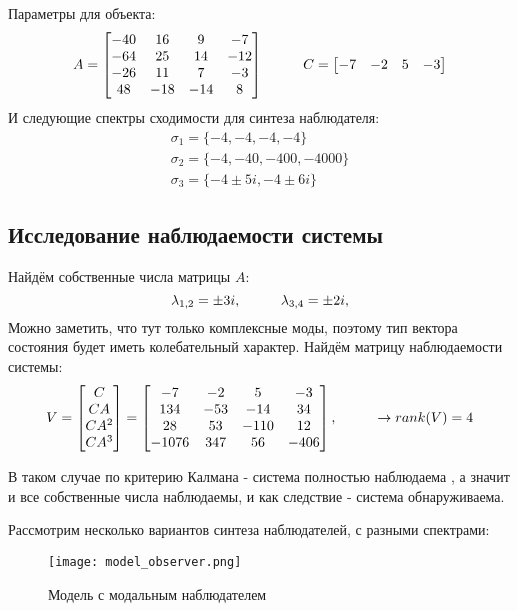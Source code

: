 Параметры для объекта:
$$
  A = \begin{bmatrix}
    -40 & 16 & 9 & -7 \\
    -64 & 25 & 14 & -12 \\
    -26 & 11 & 7 & -3 \\
    48 & -18 & -14 & 8
  \end{bmatrix} \hspace*{1cm}
  C = \begin{bmatrix}
    -7&-2&5&-3
  \end{bmatrix}
$$
И следующие спектры сходимости для синтеза наблюдателя:
$$
  \begin{aligned}
    \sigma_1 = \{-4,-4,-4,-4\} \\
    \sigma_2 = \{-4,-40,-400,-4000\} \\
    \sigma_3 = \{-4 \pm 5i, -4 \pm 6i\} 
  \end{aligned}
$$


\subsection{Исследование наблюдаемости системы}
Найдём собственные числа матрицы $A$:
$$
    \lambda_{1,2} = \pm 3i, \tab \lambda_{3,4} = \pm 2i,
$$
Можно заметить, что тут только комплексные моды, поэтому тип вектора состояния будет иметь колебательный характер.
Найдём матрицу наблюдаемости системы:
$$
V = \begin{bmatrix}
    C \\ CA \\ CA^2 \\ CA^3
\end{bmatrix} = \begin{bmatrix}
          -7     &     -2       &    5     &     -3 \\
        134      &   -53     &    -14       &   34 \\
          28    &     53   &     -110       &   12 \\
        -1076   &      347     &     56    &    -406

            \end{bmatrix}, \tab\rightarrow rank(V) = 4
$$

В таком случае по критерию Калмана - система полностью наблюдаема , а значит и все собственные числа наблюдаемы, и как следствие - система обнаруживаема.

Рассмотрим несколько вариантов синтеза наблюдателей, с разными спектрами:

\newpage
\begin{figure}[ht]
  \centering
  \texttt{[image: model\_observer.png]}
  \caption{Модель с модальным наблюдателем}
\end{figure}

